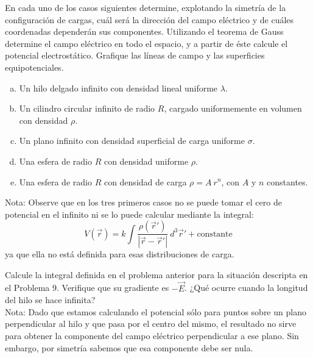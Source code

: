 \documentclass[problemas]{guia}
\begin{document}
\begin{problema}{} 
    En cada uno de los casos siguientes determine, explotando la simetría de 
    la configuración de cargas, cuál será la dirección del campo eléctrico y 
    de cuáles coordenadas dependerán sus componentes. Utilizando el teorema de
    Gauss determine el campo eléctrico en todo el espacio, y a partir de éste 
    calcule el potencial electrostático. Grafique las líneas de campo y las 
    superficies equipotenciales.
    \begin{enumerate}[(a)]
        \item Un hilo delgado infinito con densidad lineal uniforme $\lambda$.
        \item Un cilindro circular infinito de radio $R$, cargado uniformemente
            en volumen con densidad $\rho$.
        \item Un plano infinito con densidad superficial de carga uniforme 
            $\sigma$.
        \item Una esfera de radio $R$ con densidad uniforme $\rho$.
        \item Una esfera de radio $R$ con densidad de carga $\rho = A \: r^n$,
            con $A$ y $n$ constantes.
    \end{enumerate}

    Nota: Observe que en los tres primeros casos no se puede tomar el cero de 
    potencial en el infinito ni se lo puede calcular mediante la integral:
    \begin{equation*}
        V(\vec{r}) = k \int \frac{\rho(\vec{r}')}{|\vec{r}-\vec{r}'|} \: %
        d^3 \vec{r}' + \text{constante} 
    \end{equation*}
    ya que ella no está definida para esas distribuciones de carga.
\end{problema}
 
\begin{problema}{} 
    Calcule la integral definida en el problema anterior para la situación 
    descripta en el Problema 9. Verifique que su gradiente es $-\vec{E}$. ¿Qué
    ocurre cuando la longitud del hilo se hace infinita? \\
    
    Nota: Dado que estamos calculando el potencial sólo para puntos sobre un 
    plano perpendicular al hilo y que pasa por el centro del mismo, el 
    resultado no sirve para obtener la componente del campo  eléctrico  
    perpendicular  a  ese  plano.  Sin  embargo,  por  simetría  sabemos  que
    esa componente debe ser nula.
\end{problema}
\end{document}
